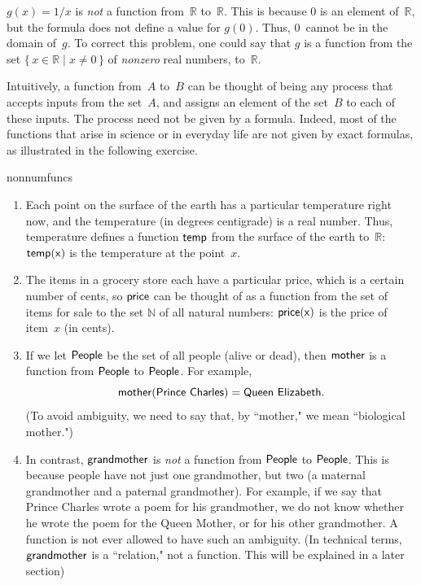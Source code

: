 \begin{example}{}
$g(x) = 1/x$ is \emph{not} a function from~$\mathbb{R}$ to~$\mathbb{R}$.
This is because $0$ is an element of~$\mathbb{R}$, but the formula does not define a value for $g(0)$.
Thus, $0$~cannot be in the domain of~$g$. To correct this problem, one could say that $g$ is a function from the set $\{\, x \in \mathbb{R} \mid x \neq 0\,\}$ of \emph{nonzero} real numbers, to~$\mathbb{R}$.
\end{example}

Intuitively, a function from~$A$ to~$B$ can be thought of being any process that accepts inputs from the set~$A$, and assigns an element of the set~$B$ to each of these inputs.
The process need not be given by a formula.
Indeed, most of the functions that arise in science or in everyday life are not given by exact formulas, as illustrated in the following exercise.

\begin{example}{nonnumfuncs} \ 
\begin{enumerate}
\item Each point on the surface of the earth has a particular temperature right now,
and the temperature (in degrees centigrade) is a real number.
Thus, temperature defines a function $\sf{temp}$ from the surface of the earth to~$\mathbb{R}$:
 $\sf{temp}(x)$ is the temperature at the point~$x$.
 \item The items in a grocery store each have a particular price, which is a certain number of cents, so $\sf{price}$ can be thought of as a function from the set of items for sale to the set $\mathbb{N}$ of all natural numbers:
 $\sf{price}(x)$ is the price of item~$x$ (in cents).
 \item If we let $\sf{People}$ be the set of all people (alive or dead), then $\sf{mother}$ is a function from $\sf{People}$ to $\sf{People}$. For example, 
 $$\var{mother}(\var{Prince\ Charles}) = \var{Queen\ Elizabeth} .$$
 (To avoid ambiguity, we need to say that, by ``mother," we mean ``biological mother.")
 \item In contrast, $\sf{grandmother}$ is \emph{not} a function
  from $\sf{People}$ to $\sf{People}$. 
 This is because people have not just one grandmother, but two (a maternal grandmother and a paternal grandmother). For example, if we say that Prince Charles wrote a poem for his grandmother, we do not know whether he wrote the poem for the Queen Mother, or for his other grandmother. A function is not ever allowed to have such an ambiguity.
 (In technical terms, $\sf{grandmother}$ is a ``relation," not a function. 
 This will be explained in a later section)
\end{enumerate}
\end{example}

